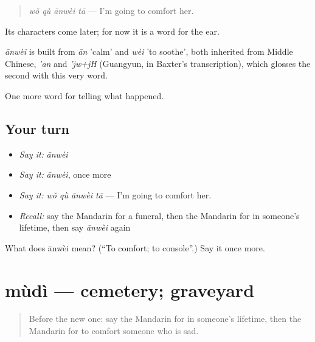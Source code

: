 \begin{quote}
\emph{wǒ qù ānwèi tā} — I'm going to comfort her.
\end{quote}

Its characters come later; for now it is a word for the ear.

\begin{cousinweb}
\emph{ānwèi} is built from \emph{ān} 'calm' and \emph{wèi} 'to soothe', both inherited from Middle Chinese, \emph{'an} and \emph{'jw+jH} (Guangyun, in Baxter's transcription), which glosses the second with this very word.
\end{cousinweb}

\begin{grammarlens}[title={What you've built}]
One more word for telling what happened.
\end{grammarlens}

\subsection*{Your turn}
\begin{itemize}
\raggedright
  \item \emph{Say it:} \emph{ānwèi}
  \item \emph{Say it:} \emph{ānwèi}, once more
  \item \emph{Say it:} \emph{wǒ qù ānwèi tā} — I'm going to comfort her.
  \item \emph{Recall:} say the Mandarin for a funeral, then the Mandarin for in someone's lifetime, then say \emph{ānwèi} again
\end{itemize}

\begin{tcolorbox}[breakable,colback=teal!4,colframe=teal!35!black,title={Before you move on}]
What does ānwèi mean? (\textquotedblleft{}To comfort; to console\textquotedblright{}.) Say it once more.
\end{tcolorbox}
\section[mùdì]{mùdì — cemetery; graveyard}

\label{lesson:ZH-C314-mudi}



\begin{quote}
Before the new one: say the Mandarin for in someone's lifetime, then the Mandarin for to comfort someone who is sad.
\end{quote}

